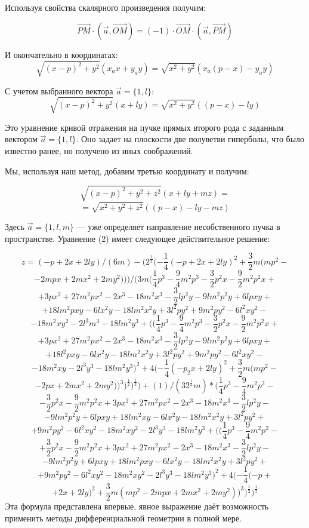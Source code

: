 Используя свойства скалярного произведения получим:

$$\overrightarrow{PM}\cdot(\vec a ,\overrightarrow{OM})=(-1)\cdot\overrightarrow{OM}\cdot(\vec a,\overrightarrow{PM})$$

И  окончательно в координатах:
\[
\sqrt{(x-p)^2+y^2}
\left(x_a x +y_a y\right)
=
\sqrt{x^2+y^2}
\left( x_a (p-x)-y_ay \right)
\]

С учетом выбранного вектора $\vec a = \{ 1,l \}$:
\[
\sqrt{(x-p)^2+y^2}
\left(x+l y\right)
=
\sqrt{x^2+y^2}
\left( (p-x)-l y \right)
\]

Это уравнение кривой отражения на пучке прямых второго рода с заданным вектором $\vec a = \{ 1,l \}$. Оно задает на плоскости две полуветви гиперболы, что было известно ранее, но получено из иных соображений.

Мы, используя наш метод, добавим третью координату и получим:

\[
\sqrt{(x-p)^2+y^2+z^2}
\left(x+l y+m z\right)
= \]
\[=
\sqrt{x^2+y^2+z^2}
\left( (p-x)-l y-m z \right)
\]


Здесь $\vec a = \{ 1,l,m\}$ --- уже определяет направление несобственного пучка в пространстве.
Уравнение (2) имеет следующее действительное решение:

$$z=(-p+2x+2ly)/(6m)-(2^\frac{1}{3}(-\frac{1}{4}(-p+2x+2ly)^2 +\frac{3}{2} m(mp^2-$$
$$-2mpx+2mx^2+2my^2)))/(3m(\frac{1}{4}p^3-\frac{9}{4}m^2p^3-\frac{3}{2}p^2x-\frac{9}{2}m^2p^2x+$$
$$+3px^2+27m^2px^2-2x^3-18m^2x^3-\frac{3}{2}lp^2y-9lm^2p^2y+6lpxy+$$
$$+18lm^2pxy-6lx^2y-18lm^2x^2y+3l^2py^2+9m^2py^2-6l^2xy^2-$$
$$-18m^2xy^2-2l^3m^3-18lm^2y^3+((\frac{1}{4}p^3-\frac{9}{4}m^2p^3-\frac{3}{2}p^2x-\frac{9}{2}m^2p^2x+$$
$$+3px^2+27m^2px^2-2x^3-18m^2x^3-\frac{3}{2}lp^2y-9lm^2p^2y+6lpxy+$$
$$+18l^2pxy-6lx^2y-18lm^2x^2y+3l^2py^2+9m^2py^2-6l^2xy^2-$$
$$-18m^2xy-2l^3y^3-18lm^2y^3)^2+4(-\frac{1}{4}(-p_2x+2ly)^2+\frac{3}{2}m(mp^2-$$
$$-2px+2mx^2+2my^2))^3)^\frac{1}{2})^\frac{1}{3}) +
(1)/(32^\frac{1}{3}m) *
(\frac{1}{4}p^3-\frac{9}{4}m^2p^2-$$
$$-\frac{3}{2}p^2x-\frac{9}{2}m^2p^2x+3px^2+27m^2px^2-2x^3-18m^2x^3-\frac{3}{2}lp^2y-$$
$$-9lm^2p^2y+6lpxy+18lm^2xy-6lx^2y-18lm^2x^2y+3l^2py^2+$$
$$+9m^2py^2-6l^2xy^2-18m^2xy^2-2l^3y^3-18lm^2y^3+((\frac{1}{4}p^3-\frac{9}{4}m^2p^2-$$
$$+\frac{3}{2}p^2x-\frac{9}{2}m^2p^2x+3px^2+27m^2px^2-2x^3-18m^2x^3-\frac{3}{2}lp^2y-$$
$$-9lm^2p^2y+6lpxy+18lm^2pxy-6lx^2y-18lm^2x^2y+3l^2py^2+$$
$$+9m^2py^2-6l^2xy^2-18m^2xy^2-2l^3y^3-18lm^2y^3)^2+4(-\frac{1}{4}(-p+$$
$$+2x+2ly)^2+\frac{3}{2}m(mp^2-2mpx+2mx^2+2my^2))^3)^\frac{1}{2})^\frac{1}{3}$$
Эта формула представлена впервые, явное выражение даёт возможность применить методы дифференциальной геометрии в полной мере.




















